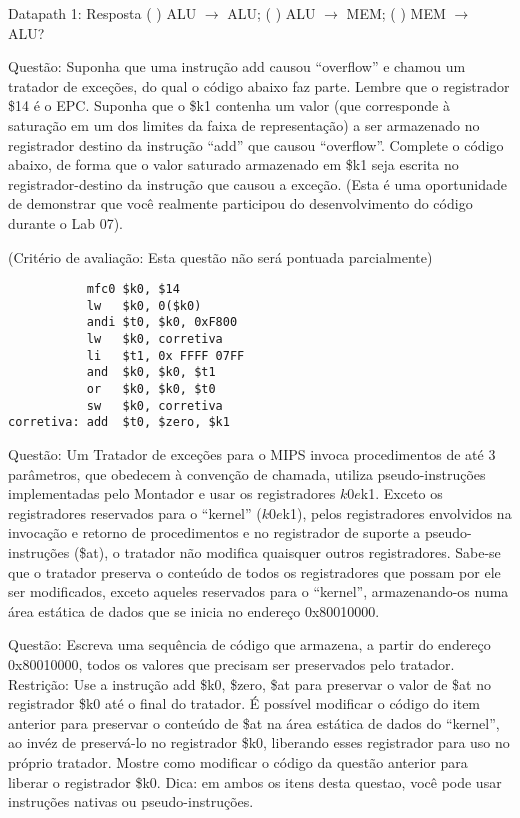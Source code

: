 \documentclass{article}
\begin{document}
Datapath 1: Resposta (     ) ALU $\rightarrow$ ALU; (      ) ALU $\rightarrow$
MEM; (       ) MEM $\rightarrow$ ALU?

Questão: Suponha que uma instrução add causou “overflow” e chamou um tratador
de exceções, do qual o código abaixo faz parte. Lembre que o registrador \$14 é
o EPC. Suponha que o \$k1 contenha um valor (que corresponde à saturação em um
dos limites da faixa de representação) a ser armazenado no registrador destino
da instrução “add” que causou “overflow”. Complete o código abaixo, de forma
que o valor saturado armazenado em \$k1 seja escrita no registrador-destino da
instrução que causou a exceção. (Esta é uma oportunidade de demonstrar que você
realmente participou do desenvolvimento do código durante o Lab 07).

(Critério de avaliação: Esta questão não será pontuada parcialmente)

\begin{verbatim}
           mfc0 $k0, $14
           lw   $k0, 0($k0)
           andi $t0, $k0, 0xF800
           lw   $k0, corretiva
           li   $t1, 0x FFFF 07FF
           and  $k0, $k0, $t1
           or   $k0, $k0, $t0
           sw   $k0, corretiva
corretiva: add  $t0, $zero, $k1
\end{verbatim}

Questão: Um Tratador de exceções para o MIPS invoca procedimentos de até 3
parâmetros, que obedecem à convenção de chamada, utiliza pseudo-instruções
implementadas pelo Montador e usar os registradores $k0 e $k1. Exceto os
registradores reservados para o “kernel” ($k0 e $k1), pelos registradores
envolvidos na invocação e retorno de procedimentos e no registrador de suporte a
pseudo-instruções (\$at), o tratador não modifica quaisquer outros
registradores. Sabe-se que o tratador preserva o conteúdo de todos os
registradores que possam por ele ser modificados, exceto aqueles reservados para
o “kernel”, armazenando-os numa área estática de dados que se inicia no endereço
0x80010000.

Questão: Escreva uma sequência de código que armazena, a partir do endereço
0x80010000, todos os valores que precisam ser preservados pelo tratador.
Restrição: Use a instrução add \$k0, \$zero, \$at para preservar o valor de \$at
no registrador \$k0 até o final do tratador. É possível modificar o código do
item anterior para preservar o conteúdo de \$at na área estática de dados do
“kernel”, ao invéz de preservá-lo no registrador \$k0, liberando esses
registrador para uso no próprio tratador. Mostre como modificar o código da
questão anterior para liberar o registrador \$k0. Dica: em ambos os itens desta
questao, você pode usar instruções nativas ou pseudo-instruções.
\end{document}
